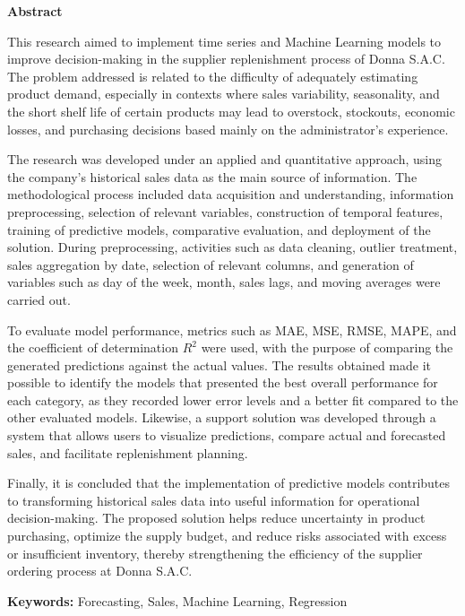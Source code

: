 \thispagestyle{plain}
\begin{center}
	\vspace*{1.5cm}
	{\Large \bfseries  Abstract}
\end{center}
\vspace{0.5cm}
This research aimed to implement time series and Machine Learning models to improve decision-making in the supplier replenishment process of Donna S.A.C. The problem addressed is related to the difficulty of adequately estimating product demand, especially in contexts where sales variability, seasonality, and the short shelf life of certain products may lead to overstock, stockouts, economic losses, and purchasing decisions based mainly on the administrator's experience.

The research was developed under an applied and quantitative approach, using the company's historical sales data as the main source of information. The methodological process included data acquisition and understanding, information preprocessing, selection of relevant variables, construction of temporal features, training of predictive models, comparative evaluation, and deployment of the solution. During preprocessing, activities such as data cleaning, outlier treatment, sales aggregation by date, selection of relevant columns, and generation of variables such as day of the week, month, sales lags, and moving averages were carried out.

To evaluate model performance, metrics such as MAE, MSE, RMSE, MAPE, and the coefficient of determination $R^2$ were used, with the purpose of comparing the generated predictions against the actual values. The results obtained made it possible to identify the models that presented the best overall performance for each category, as they recorded lower error levels and a better fit compared to the other evaluated models. Likewise, a support solution was developed through a system that allows users to visualize predictions, compare actual and forecasted sales, and facilitate replenishment planning.

Finally, it is concluded that the implementation of predictive models contributes to transforming historical sales data into useful information for operational decision-making. The proposed solution helps reduce uncertainty in product purchasing, optimize the supply budget, and reduce risks associated with excess or insufficient inventory, thereby strengthening the efficiency of the supplier ordering process at Donna S.A.C.


\textbf{Keywords: } Forecasting, Sales, Machine Learning, Regression